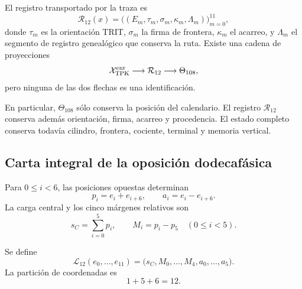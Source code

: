 \begin{definition}
\label{p3-83-c25-s4:def:registro-enriquecido-dodecafasico}
El registro transportado por la traza es
\[
 \mathcal R_{12}(x)=
 \bigl((E_m,\tau_m,\sigma_m,\kappa_m,\Lambda_m)\bigr)_{m=0}^{11},
\]
donde \(\tau_m\) es la orientación TRIT, \(\sigma_m\) la firma de
frontera, \(\kappa_m\) el acarreo, y \(\Lambda_m\) el segmento de registro genealógico
que conserva la ruta. Existe una cadena de proyecciones
\[
 \mathcal X_{\rm TPK}^{\rm enr}
 \longrightarrow\mathcal R_{12}
 \longrightarrow\Theta_{108},
\]
pero ninguna de las dos flechas es una identificación.
\end{definition}

En particular, \(\Theta_{108}\) sólo conserva la posición del calendario.
El registro \(\mathcal R_{12}\) conserva además orientación, firma,
acarreo y procedencia. El estado completo conserva todavía cilindro,
frontera, cociente, terminal y memoria vertical.

\subsection{Carta integral de la oposición dodecafásica}

Para \(0\leq i<6\), las posiciones opuestas determinan
\begin{equation}
 p_i=e_i+e_{i+6},
 \qquad
 a_i=e_i-e_{i+6}.
 \label{p3-83-c25-s4:eq:pares-opuestos-registro}
\end{equation}
La carga central y los cinco márgenes relativos son
\begin{equation}
 s_C=\sum_{i=0}^{5}p_i,
 \qquad
 M_i=p_i-p_5\quad(0\leq i<5).
 \label{p3-83-c25-s4:eq:carga-margenes-registro}
\end{equation}

\begin{definition}
\label{p3-83-c25-s4:def:carta-integral-156}
Se define
\begin{equation}
 \mathcal L_{12}(e_0,\ldots,e_{11})
 =\bigl(s_C,M_0,\ldots,M_4,a_0,\ldots,a_5\bigr).
 \label{p3-83-c25-s4:eq:carta-integral-156}
\end{equation}
La partición de coordenadas es
\[
 1+5+6=12.
\]
\end{definition}

